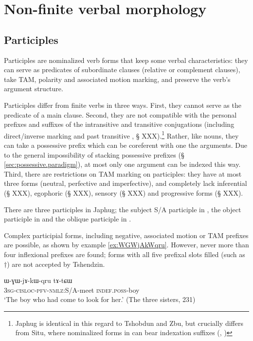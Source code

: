 \chapter{Non-finite verbal morphology}

\section{Participles}
Participles are nominalized verb forms that keep some verbal characteristics: they can serve as predicates of subordinate clauses (relative or complement clauses), take TAM, polarity and associated motion marking, and preserve the verb's argument structure.

Participles differ from finite verbs in three ways. First, they cannot serve as the predicate of a main clause. Second, they are not compatible with the personal prefixes and suffixes of the intransitive and transitive conjugations (including direct/inverse marking and past transitive , § XXX).\footnote{Japhug is identical in this regard to Tshobdun and Zbu, but crucially differs from Situ, where nominalized forms in  can bear indexation suffixes (\citet{jackson06guanxiju}, \citet{jacksonlin07}) } Rather, like nouns, they can take a possessive prefix which can be coreferent with one the arguments. Due to the general impossibility of stacking possessive prefixes (§ \ref{sec:possessive.paradigm}), at most only one argument can be indexed this way. Third, there are restrictions on TAM marking on participles: they have at most three forms (neutral, perfective and imperfective), and completely lack inferential (§ XXX), egophoric (§ XXX), sensory (§ XXX) and progressive forms (§ XXX).

There are three participles in Japhug; the subject S/A participle in , the object participle in  and the oblique participle in . 

Complex participial forms, including negative, associated motion or TAM prefixes are possible, as shown by example \ref{ex:WGWjAkWqru}. However, never more than four inflexional prefixes are found; forms with all five prefixal slots filled (such as $\dagger$) are not accepted by Tshendzin.

 \begin{exe}
\ex \label{ex:WGWjAkWqru}
\gll ɯ-ɣɯ-jɤ-kɯ-qru  	tɤ-tɕɯ  	   \\
  \textsc{3sg-cisloc-pfv-nmlz:}S/A-meet \textsc{indef.poss}-boy   \\
\glt `The boy who had come to look for her.' (The three sisters, 231)
 \end{exe}

